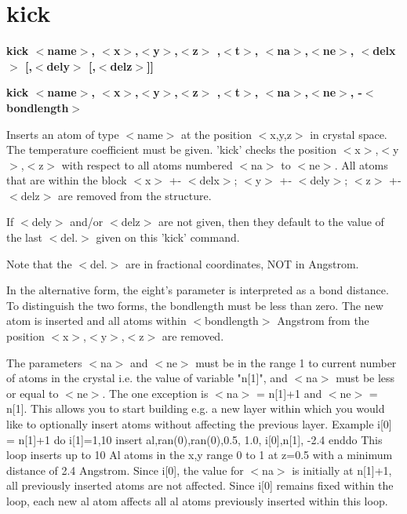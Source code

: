 \section{kick}
{\bf kick $ <$name$> $, $ <$x$> $,$ <$y$> $,$ <$z$> $ ,$ <$t$> $, $ <$na$> $,$ <$ne$> $, $ <$delx$> $ [,$ <$dely$> $ [,$ <$delz$> $]] \par }
{\bf kick $ <$name$> $, $ <$x$> $,$ <$y$> $,$ <$z$> $ ,$ <$t$> $, $ <$na$> $,$ <$ne$> $, -$ <$bondlength$> $ \par }
\par
\vspace{3pt}
Inserts an atom of type $ <$name$> $ at the position $ <$x,y,z$> $ 
in crystal space. The temperature coefficient must be given. 
'kick' checks the position $ <$x$> $,$ <$y$> $,$ <$z$> $ with respect to all atoms 
numbered $ <$na$> $ to $ <$ne$> $. All atoms that are within the block $ <$x$> $ +- $ <$delx$> $; 
$ <$y$> $ +- $ <$dely$> $; $ <$z$> $ +- $ <$delz$> $ are removed from the structure. 
\par
If $ <$dely$> $ and/or $ <$delz$> $ are not given, then they default to the value 
of the last $ <$del.$> $ given on this 'kick' command. 
\par
Note that the $ <$del.$> $ are in fractional coordinates, NOT in Angstrom. 
\par
In the alternative form, the eight's parameter is interpreted as 
a bond distance. To distinguish the two forms, the bondlength must 
be less than zero. The new atom is inserted and all atoms within 
$ <$bondlength$> $ Angstrom from the position $ <$x$> $,$ <$y$> $,$ <$z$> $ are removed. 
\par
The parameters $ <$na$> $ and $ <$ne$> $ must be in the range 1 to current 
number of atoms in the crystal i.e. the value of variable "n[1]", 
and $ <$na$> $ must be less or equal to $ <$ne$> $. 
The one exception is $ <$na$> $ = n[1]+1 and $ <$ne$> $ = n[1]. This allows you 
to start building e.g. a new layer within which you would like to 
optionally insert atoms without affecting the previous layer. 
Example 
i[0] = n[1]+1 
do i[1]=1,10 
  insert  al,ran(0),ran(0),0.5, 1.0, i[0],n[1], -2.4 
enddo 
This loop inserts up to 10 Al atoms in the x,y range 0 to 1 at 
z=0.5 with a minimum distance of 2.4 Angstrom. Since i[0], the 
value for $ <$na$> $ is initially at n[1]+1, all previously inserted 
atoms are not affected. Since i[0] remains fixed within the loop, 
each new al atom affects all al atoms previously inserted within 
this loop. 
